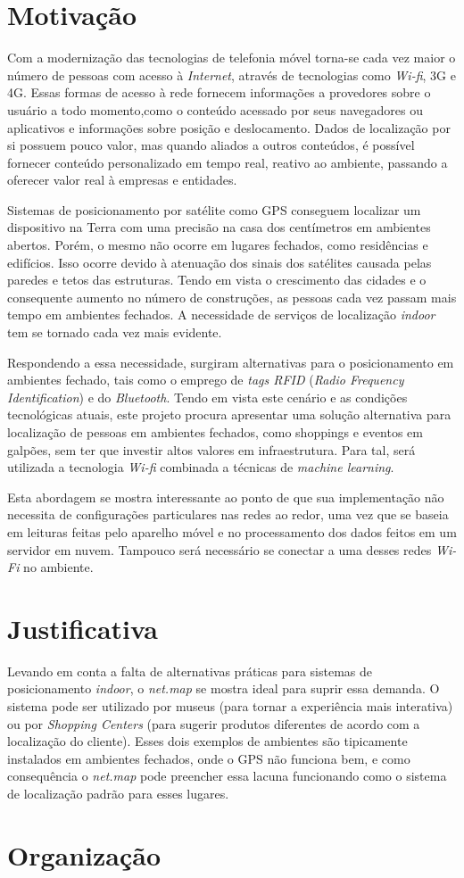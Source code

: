 \section{Motivação}\label{sec:motivation}
Com a modernização das tecnologias de telefonia móvel torna-se cada vez maior o
número de pessoas com acesso à \textit{Internet}, através de tecnologias como \textit{Wi-fi},
3G e 4G. Essas formas de acesso à rede fornecem informações a provedores sobre o
usuário a todo momento,como o conteúdo acessado por seus navegadores ou aplicativos
e informações sobre posição e deslocamento. Dados de localização por si possuem
pouco valor, mas quando aliados a outros conteúdos, é possível fornecer conteúdo
personalizado em tempo real, reativo ao ambiente, passando a oferecer valor real
à empresas e entidades.
\par
Sistemas de posicionamento por satélite como GPS conseguem localizar um dispositivo
na Terra com uma precisão na casa dos centímetros em ambientes abertos. Porém,
o mesmo não ocorre em lugares fechados, como residências e edifícios. Isso ocorre
devido à atenuação dos sinais dos satélites causada pelas paredes e tetos das
estruturas. Tendo em vista o crescimento das cidades e o consequente aumento no
número de construções, as pessoas cada vez passam mais tempo em ambientes
fechados. A necessidade de serviços de localização \textit{indoor} tem se tornado cada
vez mais evidente.
\par
Respondendo a essa necessidade, surgiram alternativas para o posicionamento em
ambientes fechado, tais como o emprego de \textit{tags RFID} (\textit{Radio Frequency Identification}) e do \textit{Bluetooth}. Tendo em vista este
cenário e as condições tecnológicas atuais, este projeto procura apresentar uma
solução alternativa para localização de pessoas em ambientes fechados, como shoppings e
eventos em galpões, sem ter que investir altos valores em infraestrutura. Para tal, será utilizada a tecnologia \textit{Wi-fi} combinada a técnicas de \textit{machine learning}.
\par
Esta abordagem se mostra interessante ao ponto de que sua implementação não
necessita de configurações particulares nas redes ao redor, uma vez que se baseia
em leituras feitas pelo aparelho móvel e no processamento dos dados feitos em um
servidor em nuvem. Tampouco será necessário se conectar a uma desses redes
\textit{Wi-Fi} no ambiente.

\section{Justificativa}\label{sec:justify}
Levando em conta a falta de alternativas práticas para sistemas de posicionamento \textit{indoor}, o \textit{net.map} se mostra ideal para suprir essa demanda. O sistema pode ser utilizado por museus (para tornar a experiência mais interativa) ou por \textit{Shopping Centers}  (para sugerir produtos diferentes de acordo com a localização do cliente). Esses dois exemplos de ambientes são tipicamente instalados em ambientes fechados, onde o GPS não funciona bem, e como consequência o \textit{net.map} pode preencher essa lacuna funcionando como o sistema de localização padrão para esses lugares.

\section{Organização}\label{sec:justify}
